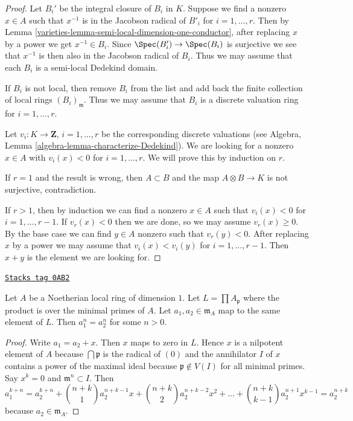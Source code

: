 \begin{proof}

Let $B_i'$ be the integral closure of $B_i$ in $K$. Suppose we find a
nonzero $x \in A$ such that $x^{-1}$ is in the Jacobson radical of $B'_i$ for
$i = 1, \ldots, r$. Then by
Lemma \ref{varieties-lemma-semi-local-dimension-one-conductor},
after replacing $x$ by a power we get $x^{-1} \in B_i$.
Since $\Spec(B'_i) \to \Spec(B_i)$ is surjective we
see that $x^{-1}$ is then also in the Jacobson radical of $B_i$.
Thus we may assume that each $B_i$ is a semi-local Dedekind domain.

\medskip\noindent
If $B_i$ is not local, then remove $B_i$ from the list and
add back the finite collection of local rings $(B_i)_\mathfrak m$.
Thus we may assume that $B_i$ is a discrete valuation ring for
$i = 1, \ldots, r$.

\medskip\noindent
Let $v_i : K \to \mathbf{Z}$, $i = 1, \ldots, r$
be the corresponding discrete valuations (see
Algebra, Lemma \ref{algebra-lemma-characterize-Dedekind}).
We are looking for a nonzero $x \in A$ with $v_i(x) < 0$ for
$i = 1, \ldots, r$. We will prove this by induction on $r$.

\medskip\noindent
If $r = 1$ and the result is wrong, then $A \subset B$ and the map
$A \otimes B \to K$ is not surjective, contradiction.

\medskip\noindent
If $r > 1$, then by induction we can find a nonzero $x \in A$ such that
$v_i(x) < 0$ for $i = 1, \ldots, r - 1$. If $v_r(x) < 0$ then we are
done, so we may assume $v_r(x) \geq 0$. By the base case we can find
$y \in A$ nonzero such that $v_r(y) < 0$. After replacing $x$ by a
power we may assume that $v_i(x) < v_i(y)$ for $i = 1, \ldots, r - 1$.
Then $x + y$ is the element we are looking for.
\end{proof}

\begin{lemma}
\label{varieties-lemma-power-equal}
\href{https://stacks.math.columbia.edu/tag/0AB2}{\texttt{Stacks tag 0AB2}}

Let $A$ be a Noetherian local ring of dimension $1$.
Let $L = \prod A_\mathfrak p$ where the product is over
the minimal primes of $A$. Let $a_1, a_2 \in \mathfrak m_A$
map to the same element of $L$. Then $a_1^n = a_2^n$ for
some $n > 0$.
\end{lemma}

\begin{proof}
Write $a_1 = a_2 + x$. Then $x$ maps to zero in $L$. Hence
$x$ is a nilpotent element of $A$ because $\bigcap \mathfrak p$
is the radical of $(0)$ and the annihilator $I$ of $x$ contains
a power of the maximal ideal because $\mathfrak p \not \in V(I)$
for all minimal primes. Say $x^k = 0$ and $\mathfrak m^n \subset I$.
Then
$$
a_1^{k + n} = a_2^{k + n} + {n + k \choose 1} a_2^{n + k - 1} x +
{n + k \choose 2} a_2^{n + k - 2} x^2 + \ldots +
{n + k \choose k - 1} a_2^{n + 1} x^{k - 1} = a_2^{n + k}
$$
because $a_2 \in \mathfrak m_A$.
\end{proof}

